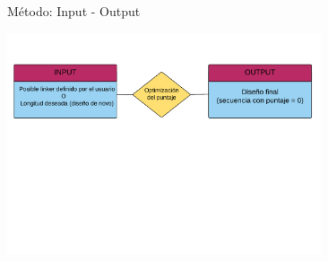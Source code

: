 \documentclass{beamer}
\begin{document}






\begin{frame}{Método: Input - Output}


\vspace{24px}
\begin{adjustwidth}{-2.0em}{-2.0em}
\includegraphics[width=350px]{../img/coarseGrainedPatena-Spanish.png}
\end{adjustwidth}


\end{frame}
\end{document}
